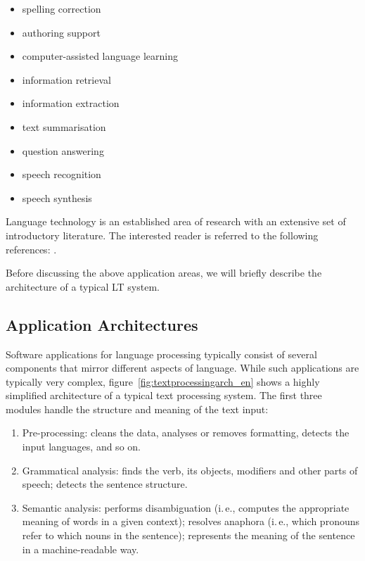 \documentclass[]{../../metanetpaper}
\begin{document}
\begin{multicols}{2}
\begin{itemize}
\item spelling correction
\item authoring support
\item computer-assisted language learning
\item information retrieval 
\item information extraction
\item text summarisation
\item question answering
\item speech recognition 
\item speech synthesis 
\end{itemize}

Language technology is an established area of research with an extensive set of introductory literature. The interested reader is referred to the following references:  \cite{carstensen-etal1, jurafsky-martin01, manning-schuetze1, lt-world1, lt-survey1}.

Before discussing the above application areas, we will briefly describe the architecture of a typical LT system.

\subsection{Application Architectures}

Software applications for language processing typically consist of several components that mirror different aspects of language. While such applications are typically very complex, figure~\ref{fig:textprocessingarch_en} shows a highly simplified architecture of a typical text processing system. The first three modules handle the structure and meaning of the text input:

\begin{enumerate}
\item Pre-processing: cleans the data, analyses or removes formatting, detects the input languages, and so on.
\item Grammatical analysis: finds the verb, its objects, modifiers and other parts of speech; detects the sentence structure.
\item Semantic analysis: performs disambiguation (i.\,e., computes the appropriate meaning of words in a given context); resolves anaphora (i.\,e., which pronouns refer to which nouns in the sentence); represents the meaning of the sentence in a machine-readable way.
\end{enumerate}


\end{multicols}
\end{document}
